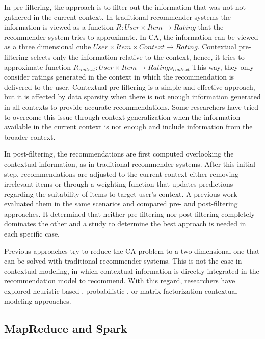 \documentclass[preprint]{elsarticle}
\begin{document}
\begin{spacing}{1.5}
In pre-filtering, the approach is to filter out the information that was not not gathered in the current context. In traditional recommender systems the information is viewed as a function $R: User \times Item \rightarrow Rating $ that the recommender system tries to approximate. In CA, the information can be viewed as a three dimensional cube $User \times Item \times Context \rightarrow Rating$. Contextual pre-filtering selects only the information relative to the context, hence, it tries to approximate function $R_{context}: User \times Item \rightarrow Ratings_{context}$ This way, they only consider ratings generated in the context in which the recommendation is delivered to the user. Contextual pre-filtering is a simple and effective approach, but it is affected by data sparsity when there is not enough information generated in all contexts to provide accurate recommendations. Some researchers have tried to overcome this issue through context-generalization \cite{Adomavicius2011} when the information available in the current context is not enough and include information from the broader context.

In post-filtering, the recommendations are first computed overlooking the contextual information, as in traditional recommender systems. After this initial step, recommendations are adjusted to the current context either removing irrelevant items or through a weighting function that updates predictions regarding the suitability of items to target user's context. A previous work \cite{Panniello2009} evaluated them in the same scenarios and compared pre- and post-filtering approaches. It determined that neither pre-filtering nor post-filtering completely dominates the other and a study to determine the best approach is needed in each specific case.

Previous approaches try to reduce the CA problem to a two dimensional one that can be solved with traditional recommender systems. This is not the case in contextual modeling, in which contextual information is directly integrated in the recommendation model to recommend. With this regard, researchers have explored heuristic-based \cite{Panniello2014}, probabilistic \cite{Adomavicius2005b}, or matrix factorization \cite{Baltrunas2011c} contextual modeling approaches.

\subsection{MapReduce and Spark}
\label{sec:background-mapreduce-and-spark}


\end{spacing}
\end{document}
